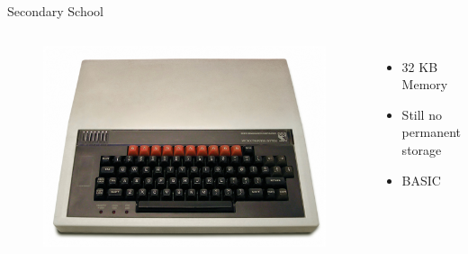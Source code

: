 \documentclass{beamer}
\begin{document}
  \begin{frame}{Secondary School}
    \begin{columns}
        \begin{figure}
          \includegraphics[scale=0.2]{images/bbc_micro}
        \end{figure}
      \begin{itemize}
          \item 32 KB Memory
          \item Still no permanent storage
          \item BASIC
        \end{itemize}
    \end{columns}
  \end{frame}
\end{document}
